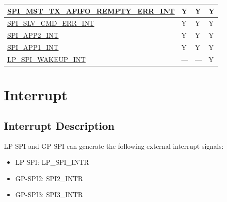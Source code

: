 \documentclass[main\_\_EN.tex]{subfiles}
\begin{document}
\begin{longtable}{|p{7.5cm}|p{1.5cm}|p{1.5cm}|p{1.5cm}|}
\hyperref[int:SPIMSTTXAFIFOREMPTYERRINT]{SPI\_MST\_TX\_AFIFO\_REMPTY\_ERR\_INT} & Y & Y & Y\\ \hline
\hyperref[int:SPISLVCMDERRINT]{SPI\_SLV\_CMD\_ERR\_INT} & Y & Y & Y\\ \hline
\hyperref[int:SPIAPP2INT]{SPI\_APP2\_INT} & Y & Y & Y\\ \hline
\hyperref[int:SPIAPP1INT]{SPI\_APP1\_INT} & Y & Y & Y\\ \hline
\hyperref[int:LPSPIWAKEUPINT]{LP\_SPI\_WAKEUP\_INT} & --- & --- & Y \\ \hline
\end{longtable}

\section{Interrupt}
\label{sec:spi-interrupt}

\subsection{Interrupt Description}

\chipname{} LP-SPI and GP-SPI can generate the following external interrupt signals:
\begin{itemize}
    \item LP-SPI: LP\_SPI\_INTR
    \item GP-SPI2: SPI2\_INTR
    \item GP-SPI3: SPI3\_INTR
\end{itemize}
\end{document}
